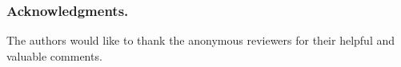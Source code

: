 {\subsubsection{Acknowledgments.}The authors would like to thank the anonymous reviewers for their helpful and valuable comments.


%
%

%


{\raggedright
	\printbibliography[segment=\therefsegment,heading=subbibliography]
}

}

%
%
%
%
%
%
%
%
